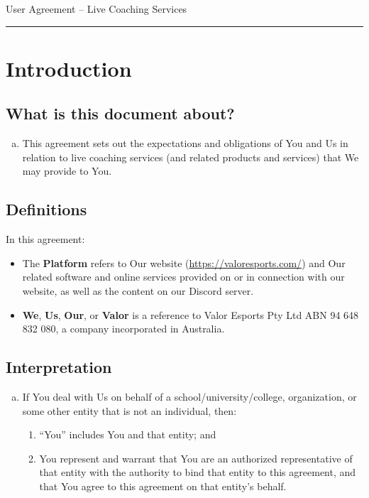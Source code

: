 \documentclass[10pt]{article}
\begin{document}
{\Large User Agreement -- Live Coaching Services}

\hrule height .1mm

\vspace{.5cm}

\section{Introduction}

\subsection{What is this document about?}
\begin{enumerate}[(a)]
\item
This agreement sets out the expectations and obligations of You and Us in relation to live coaching services (and related products and services) that We may provide to You.
\end{enumerate}

\subsection{Definitions}
In this agreement:

\begin{itemize}[label={}]
\item
The \textbf{Platform} refers to Our website (\url{https://valoresports.com/}) and Our related software and online services provided on or in connection with our website, as well as the content on our Discord server.

\item
\textbf{We}, \textbf{Us}, \textbf{Our}, or \textbf{Valor} is a reference to Valor Esports Pty Ltd ABN 94 648 832 080, a company incorporated in Australia.
\end{itemize}

\subsection{Interpretation}
\begin{enumerate}[(a)]
\item
If You deal with Us on behalf of a school/university/college, organization, or some other entity that is not an individual, then:
\begin{enumerate}[(1)]
\item
``You'' includes You and that entity; and

\item
You represent and warrant that You are an authorized representative of that entity with the authority to bind that entity to this agreement, and that You agree to this agreement on that entity’s behalf.
\end{enumerate}
\end{enumerate}
\end{document}
